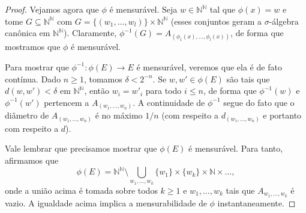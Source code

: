 \documentclass[reqno]{article}
\newcommand*\1{\mathds{1}}
\newcommand{\mcup}{\textstyle \bigcup\limits}
\begin{document}
\begin{proof}
  Vejamos agora que $\phi$ é mensurável.
  Seja $w \in \mathbb{N}^\mathbb{N}$ tal que $\phi(x) = w$ e tome $G \subseteq \mathbb{N}^\mathbb{N}$ com $G = \{(w_1, \dots, w_l)\} \times \mathbb{N}^\mathbb{N}$ (esses conjuntos geram a $\sigma$-álgebra canônica em $\mathbb{N}^\mathbb{N}$).
  Claramente, $\phi^{-1}(G) = A_{(\phi_1(x), \dots, \phi_l(x))}$, de forma que mostramos que $\phi$ é mensurável.

  Para mostrar que $\phi^{-1}:\phi(E) \to E$ é mensurável, veremos que ela é de fato contínua.
  Dado $n \geq 1$, tomamos $\delta < 2^{-n}$.
  Se $w, w' \in \phi(E)$ são tais que $d(w, w') < \delta$ em $\mathbb{N}^\mathbb{N}$, então $w_i = w'_i$ para todo $i \leq n$, de forma que $\phi^{-1}(w)$ e $\phi^{-1}(w')$ pertencem a $A_{(w_1, \dots, w_n)}$.
  A continuidade de $\phi^{-1}$ segue do fato que o diâmetro de $A_{(w_1, \dots, w_n)}$ é no máximo $1/n$ (com respeito a $d_{(w_1, \dots, w_n)}$ e portanto com respeito a $d$).

  Vale lembrar que precisamos mostrar que $\phi(E)$ é mensurável.
  Para tanto, afirmamos que
  \begin{equation}
    \label{e:phiE_mensur}
    \phi(E) = \mathbb{N}^\mathbb{N} \setminus \mcup_{w_1, \dots, w_k} \{w_1\} \times \{w_k\} \times \mathbb{N} \times \dots,
  \end{equation}
  onde a união acima é tomada sobre todos $k \geq 1$ e $w_1, \dots, w_k$ tais que $A_{w_1, \dots, w_k}$ é vazio.
  A igualdade acima implica a mensurabilidade de $\phi$ instantaneamente.


\end{proof}
\end{document}

